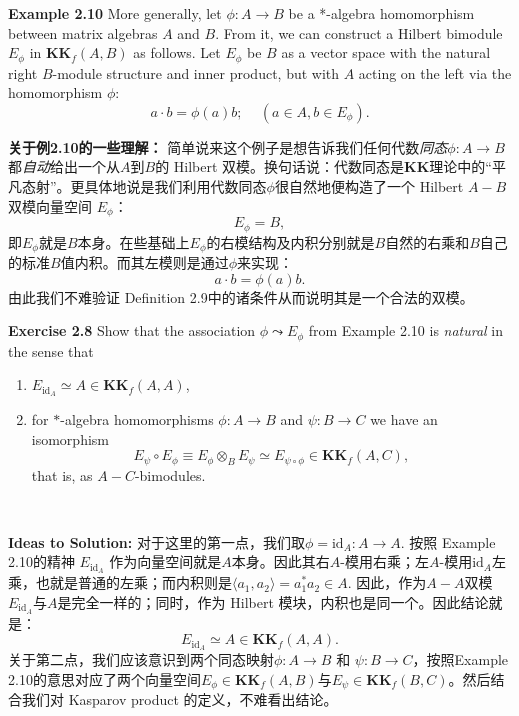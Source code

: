 \textbf{Example 2.10} More generally, let $\phi:A\rightarrow B$ be a *-algebra homomorphism between matrix algebras $A$ and $B$. From it, we can construct a Hilbert bimodule $E_\phi$ in $\textbf{KK}_f(A,B)$ as follows. Let $E_\phi$ be $B$ as a vector space with the natural right $B$-module structure and inner product, but with $A$ acting on the left via the homomorphism $\phi$:
\begin{equation}
    a\cdot b=\phi(a)b; \,\quad (a\in A, b\in E_\phi).
\end{equation}

\textbf{关于例2.10的一些理解：} 简单说来这个例子是想告诉我们任何代数\textit{同态}$\phi:A\rightarrow B$ 都\textit{自动}给出一个从$A$到$B$的 Hilbert 双模。换句话说：代数同态是$\mathbf{KK}$理论中的“平凡态射”。更具体地说是我们利用代数同态$\phi$很自然地便构造了一个 Hilbert $A-B$ 双模向量空间 $E_{\phi}$：\[E_{\phi}=B,\]即$E_{\phi}$就是$B$本身。在些基础上$E_{\phi}$的右模结构及内积分别就是$B$自然的右乘和$B$自己的标准$B$值内积。而其左模则是通过$\phi$来实现：\[a\cdot b=\phi(a)b.\]由此我们不难验证 Definition 2.9中的诸条件从而说明其是一个合法的双模。

\textbf{Exercise 2.8} Show that the association $\phi\leadsto E_{\phi}$ from Example 2.10 is \textit{natural} in the sense that 
\begin{enumerate}
    \item $E_{\text{id}_A}\simeq A\in \textbf{KK}_f(A, A)$,
    \item for $*$-algebra homomorphisms $\phi:A\rightarrow B$ and $\psi:B\rightarrow C$ we have an isomorphism \begin{equation}
        E_\psi \circ E_\phi\equiv E_\phi\otimes_B E_\psi\simeq E_{\psi\circ\phi}\in\textbf{KK}_f(A, C),
    \end{equation} that is, as $A-C$-bimodules.
\end{enumerate}\

\textbf{Ideas to Solution:} 对于这里的第一点，我们取$\phi= \text{id}_A:A\rightarrow A$. 按照 Example 2.10的精神 $E_{\text{id}_A}$ 作为向量空间就是$A$本身。因此其右$A$-模用右乘；左$A$-模用$\text{id}_A$左乘，也就是普通的左乘；而内积则是$\langle a_1,a_2\rangle=a_1^*a_2\in A$. 因此，作为$A-A$双模$E_{\text{id}_A}$与$A$是完全一样的；同时，作为 Hilbert 模块，内积也是同一个。因此结论就是：\[E_{\text{id}_A}\simeq A\in \mathbf{KK}_f(A, A).\]
关于第二点，我们应该意识到两个同态映射$\phi:A\rightarrow B$ 和 $\psi:B\rightarrow C$，按照Example 2.10的意思对应了两个向量空间$E_{\phi}\in\mathbf{KK}_f(A, B)$与$E_{\psi}\in\mathbf{KK}_f(B, C)$。然后结合我们对 Kasparov product 的定义，不难看出结论。

